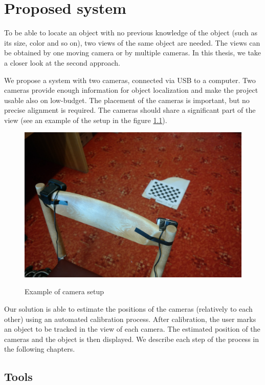\chapter{Proposed system}

To be able to locate an object with no previous knowledge of the object (such
as its size, color and so on), two views of the same object are needed. The
views can be obtained by one moving camera or by multiple cameras. In this
thesis, we take a closer look at the second approach.

We propose a system with two cameras, connected via USB to a computer.
Two cameras provide enough information for object localization and make the
project usable also on low-budget. The placement of the cameras is important,
but no precise alignment is required. The cameras should share a significant part
of the view (see an example of the setup in the figure \ref{fig:camera-setup}).

\begin{figure}
	\includegraphics[width=\linewidth]{img/camera-positions.jpg}
	\label{fig:camera-setup}
	\caption{Example of camera setup}
\end{figure}

Our solution is able to estimate the positions of the cameras (relatively to
each other) using an automated calibration process. After calibration, the user
marks an object to be tracked in the view of each camera. The estimated
position of the cameras and the object is then displayed. We describe each step
of the process in the following chapters.

\section{Tools}

